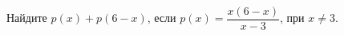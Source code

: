 \begin{ex}
	\begin{condition}
		Найдите \( p(x)+p(6-x) \), если \( p(x)=\dfrac{x(6-x)}{x-3} \), при \( x\neq3 \).
	\end{condition}
\end{ex}